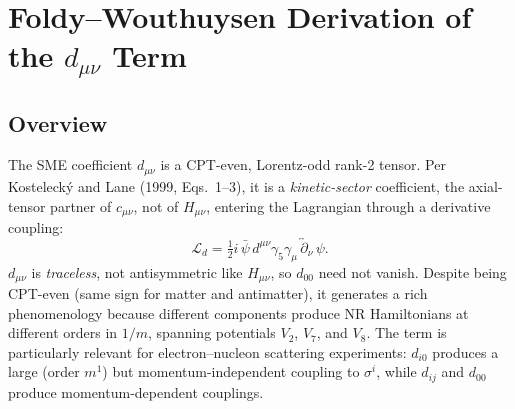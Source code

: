 \documentclass[main]{subfiles}
\begin{document}
\section{Foldy--Wouthuysen Derivation of the \texorpdfstring{$d_{\mu\nu}$}{d\_mu\_nu} Term}
\label{sec:dmunu}

\subsection{Overview}

The SME coefficient $d_{\mu\nu}$ is a CPT-even, Lorentz-odd rank-2 tensor.
Per Kostelecký and Lane (1999, Eqs.~1--3), it is a \emph{kinetic-sector}
coefficient, the axial-tensor partner of $c_{\mu\nu}$, not of $H_{\mu\nu}$,
entering the Lagrangian through a derivative coupling:
\begin{equation}
  \mathcal L_d = \tfrac12 i\,\bar\psi\,d^{\mu\nu}\gamma_5\gamma_\mu\,
  \overleftrightarrow\partial_\nu\,\psi. \label{eq:Ld}
\end{equation}
$d_{\mu\nu}$ is \emph{traceless}, not antisymmetric like $H_{\mu\nu}$, so
$d_{00}$ need not vanish. Despite being CPT-even (same sign for matter and
antimatter), it generates a rich phenomenology because different components
produce NR Hamiltonians at different orders in $1/m$, spanning potentials
$V_2$, $V_7$, and $V_8$. The term is particularly relevant for
electron--nucleon scattering experiments: $d_{i0}$ produces a large (order
$m^1$) but momentum-independent coupling to $\sigma^i$, while $d_{ij}$ and
$d_{00}$ produce momentum-dependent couplings.
\end{document}
